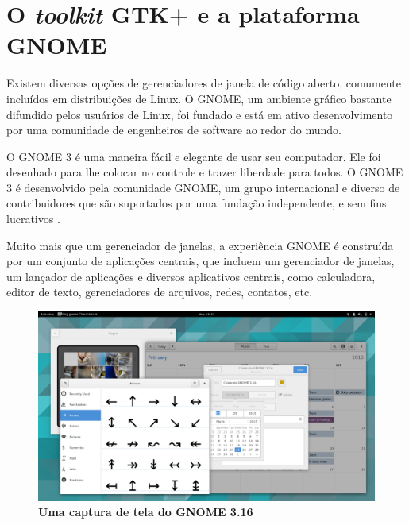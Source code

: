 \section{O \textit{toolkit} GTK+ e a plataforma GNOME}

Existem diversas opções de gerenciadores de janela de código aberto, comumente
incluídos em distribuições de Linux. O GNOME, um ambiente gráfico bastante
difundido pelos usuários de Linux, foi fundado e está em ativo desenvolvimento
por uma comunidade de engenheiros de software ao redor do mundo.

\begin{citacao}
    O GNOME 3 é uma maneira fácil e elegante de usar seu computador.
    Ele foi desenhado para lhe colocar no controle e trazer liberdade para
    todos. O GNOME 3 é desenvolvido pela comunidade GNOME, um grupo
    internacional e diverso de contribuidores que são suportados por uma
    fundação independente, e sem fins lucrativos \cite{gnome-org}.
\end{citacao}

Muito mais que um gerenciador de janelas, a experiência GNOME é construída por
um conjunto de aplicações centrais, que incluem um gerenciador de janelas, um
lançador de aplicações e diversos aplicativos centrais, como calculadora,
editor de texto, gerenciadores de arquivos, redes, contatos, etc.

\begin{figure}[!ht]
  \begin{center}
    \label{mclasen-new-apps}
    \caption{\textbf{Uma captura de tela do GNOME 3.16}}
    \includegraphics [width=\textwidth]{image/mclasen-new-apps.png}
  \end{center}
\end{figure}

